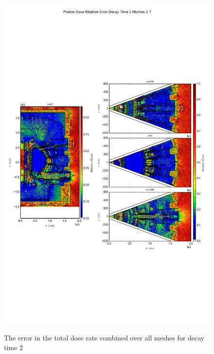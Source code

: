 \documentclass[12pt]{article}
\begin{document}
\begin{figure}[ht!]
\centering
\includegraphics[trim={0cm 9cm 0cm 10cm},clip,scale=0.75]{../plots/final_model/Photon_Dose_Relative_Error_Decay_Time_2_Meshes_1-7.png}
\label{fig:photons_dc2_no4bc_total_error}
\caption{The error in the total dose rate combined over all meshes for decay time 2}
\end{figure}
\end{document}
